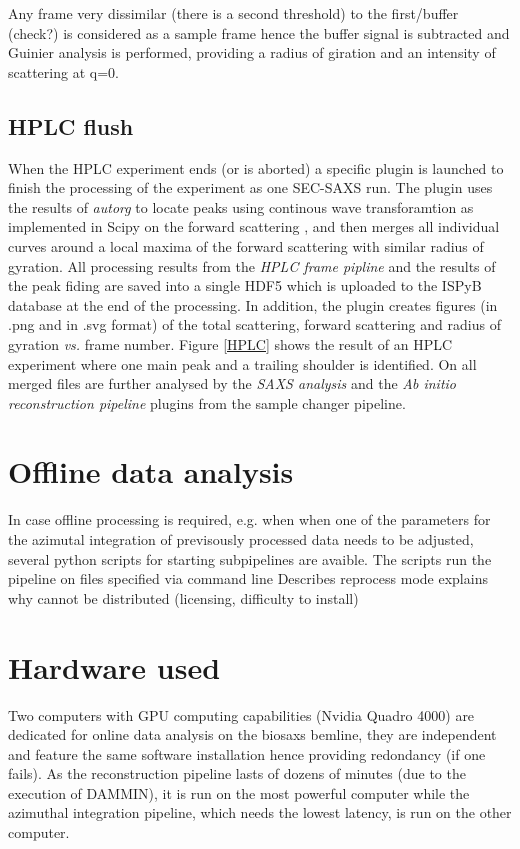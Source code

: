 \documentclass[preprint,pdf]{iucr}              %
\begin{document}
Any frame very dissimilar (there is a second threshold) to the first/buffer
(check?) is considered as a sample frame hence the buffer signal is subtracted
and Guinier analysis is performed, providing a radius of giration and an
intensity of scattering at q=0.

\subsection{HPLC flush}
When the HPLC experiment ends (or is aborted) a specific plugin is launched to
finish the processing of the experiment as one SEC-SAXS run. The plugin uses the results of \textit{autorg} to locate peaks using continous wave transforamtion as implemented in Scipy on the forward scattering \cite{cwt,scipy}, and then merges all individual curves around a local maxima of the forward scattering with similar radius of gyration. All processing results from the \textit{HPLC frame pipline} and the results of the peak fiding are
saved into a single HDF5 which is uploaded to the ISPyB database at the end of the processing. In addition, the plugin creates figures (in .png and in .svg format) of the total scattering, forward scattering and radius of gyration \textit{vs.} frame number. Figure \ref{HPLC} shows the result of an HPLC
experiment where one main peak and a trailing shoulder is identified.
On all merged files are further analysed by the \textit{SAXS analysis} and the \textit{Ab initio reconstruction pipeline} plugins from the sample changer pipeline.

\section{Offline data analysis}
In case offline processing is required, e.g. when when one of the parameters for the azimutal integration of previsously processed data needs to be adjusted, several python scripts for starting subpipelines are avaible. The scripts run the pipeline on files specified via command line   Describes reprocess mode
explains why cannot be distributed (licensing, difficulty to install)

\section{Hardware used}
Two computers with GPU computing capabilities (Nvidia Quadro 4000) are dedicated
for online data analysis on the biosaxs bemline, they are independent and
feature the same software installation hence providing redondancy (if one
fails).
As the  reconstruction pipeline lasts of dozens of minutes
(due to the execution of DAMMIN), it is run on the most powerful computer while
the azimuthal integration pipeline, which needs the lowest latency, is run on
the other computer.
\end{document}
